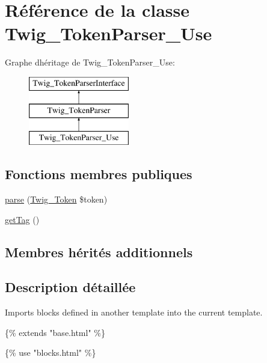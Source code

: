 \hypertarget{class_twig___token_parser___use}{}\section{Référence de la classe Twig\+\_\+\+Token\+Parser\+\_\+\+Use}
\label{class_twig___token_parser___use}
Graphe d\textquotesingle{}héritage de Twig\+\_\+\+Token\+Parser\+\_\+\+Use\+:\begin{figure}[H]
\begin{center}
\leavevmode
\includegraphics[height=3.000000cm]{class_twig___token_parser___use}
\end{center}
\end{figure}
\subsection*{Fonctions membres publiques}
\begin{DoxyCompactItemize}
\item 
\hyperlink{class_twig___token_parser___use_a5dfa2e269321584fb74e8b43dabe0efd}{parse} (\hyperlink{class_twig___token}{Twig\+\_\+\+Token} \$token)
\item 
\hyperlink{class_twig___token_parser___use_ab86ba36154b20e6bbfa3ba705f12f9d6}{get\+Tag} ()
\end{DoxyCompactItemize}
\subsection*{Membres hérités additionnels}


\subsection{Description détaillée}
Imports blocks defined in another template into the current template.


\begin{DoxyPre}
\{\% extends "base.html" \%\}\end{DoxyPre}



\begin{DoxyPre}\{\% use "blocks.html" \%\}\end{DoxyPre}



